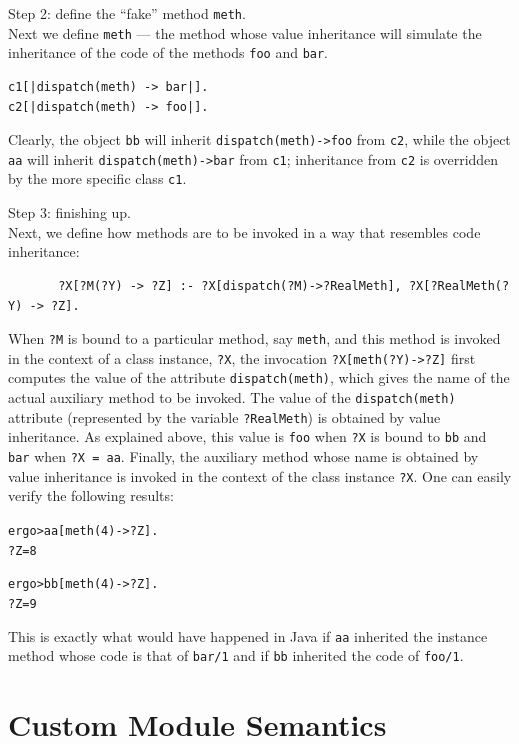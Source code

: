 \documentclass[11pt]{article}
\newcommand{\prompt}{ergo> }
\begin{document}
\noindent
Step 2: define the ``fake'' method \texttt{meth}.\\
Next we define {\tt meth} --- the method whose
value inheritance will simulate the inheritance of the code of the methods
{\tt foo} and {\tt bar}.   
\begin{verbatim}
c1[|dispatch(meth) -> bar|].  
c2[|dispatch(meth) -> foo|].
\end{verbatim}
Clearly, the object {\tt bb} will inherit {\tt dispatch(meth)->foo} from
{\tt c2},
while the object {\tt aa}    will inherit {\tt dispatch(meth)->bar} from
{\tt c1};
inheritance from {\tt c2} is overridden by the more specific class
\texttt{c1}.  

\noindent
Step 3: finishing up.\\
Next, we define how methods are to be invoked in a way that resembles
code inheritance:
\begin{verbatim}
       ?X[?M(?Y) -> ?Z] :- ?X[dispatch(?M)->?RealMeth], ?X[?RealMeth(?Y) -> ?Z].
\end{verbatim}
When {\tt ?M} is bound to a particular method, say {\tt meth}, and this
method is invoked in the context of a class instance, {\tt ?X}, the
invocation {\tt ?X[meth(?Y)->?Z]} first computes the value of the attribute
{\tt dispatch(meth)}, which gives the name of the actual auxiliary method to be
invoked. The value of the {\tt dispatch(meth)} attribute (represented by
the variable {\tt ?RealMeth}) is obtained by
value inheritance.  As explained above, this value is
{\tt foo} when {\tt ?X} is bound to {\tt bb} and {\tt bar} when {\tt ?X =
  aa}.  Finally, the auxiliary method whose name is obtained by value
inheritance is invoked in the context of the class instance {\tt ?X}.  One
can easily verify the following results:
\begin{alltt}
    \prompt aa[meth(4) -> ?Z].
    ?Z = 8

    \prompt bb[meth(4) -> ?Z].
    ?Z = 9
\end{alltt}
This is exactly what would have happened in Java if {\tt aa} inherited
the instance method whose code is that of
{\tt bar/1} and if {\tt bb} inherited the code of {\tt foo/1}.  


\section{Custom Module Semantics}\label{sec-semantics-directive}
\end{document}
